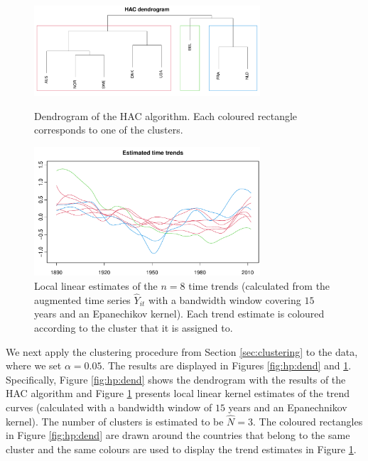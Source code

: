 \documentclass[12pt]{article}
\begin{document}
\begin{figure}[t!]
\begin{center}
\includegraphics[width=0.75\textwidth]{output/plots/hp/dendrogram}
\caption{Dendrogram of the HAC algorithm. Each coloured rectangle corresponds to one of the clusters.}\label{fig:hp:dend}

\includegraphics[width=0.75\textwidth]{output/plots/hp/all_clusters}
\caption{Local linear estimates of the $n=8$ time trends (calculated from the augmented time series $\widehat{Y}_{it}$ with a bandwidth window covering $15$ years and an Epanechikov kernel). Each trend estimate is coloured according to the cluster that it is assigned to. }\label{fig:hp:all_clusters}
\end{center}
\end{figure}


We next apply the clustering procedure from Section \ref{sec:clustering} to the data, where we set $\alpha = 0.05$. The results are displayed in Figures \ref{fig:hp:dend} and \ref{fig:hp:all_clusters}. Specifically, Figure \ref{fig:hp:dend} shows the dendrogram with the results of the HAC algorithm and Figure \ref{fig:hp:all_clusters} presents local linear kernel estimates of the trend curves (calculated with a bandwidth window of $15$ years and an Epanechnikov kernel). The number of clusters is estimated to be $\widehat{N} = 3$. The coloured rectangles in Figure \ref{fig:hp:dend} are drawn around the countries that belong to the same cluster and the same colours are used to display the trend estimates in Figure \ref{fig:hp:all_clusters}.
\end{document}
